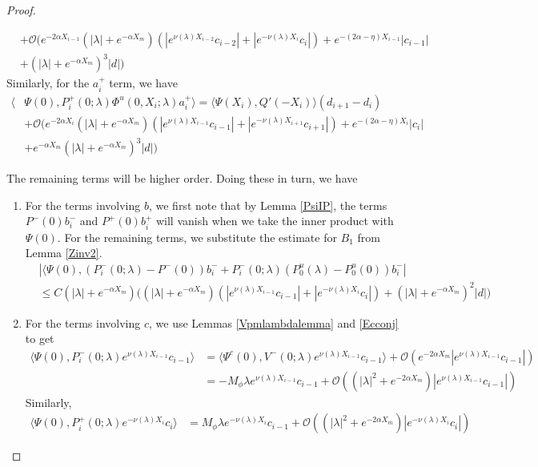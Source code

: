 \documentclass[thesis.tex]{subfiles}
\begin{document}
\begin{lemma}
\begin{proof}
\begin{enumerate}
\begin{align*}
&+ \mathcal{O}\Big(  
e^{-2 \alpha X_{i-1}} (|\lambda| + e^{-\alpha X_m})(|e^{\nu(\lambda)X_{i-2}} c_{i-2}| + |e^{-\nu(\lambda)X_i}c_i|) + e^{-(2 \alpha - \eta)X_{i-1}}|c_{i-1}| \\
&+ (|\lambda| + e^{-\alpha X_m})^3 |d| )
\end{align*}
Similarly, for the $a_i^+$ term, we have
\begin{align*}
\langle &\Psi(0), P_i^+(0; \lambda) \Phi^u(0, X_i; \lambda) a_i^+ \rangle = \langle \Psi(X_i), Q'(-X_i) \rangle (d_{i+1} - d_i ) \\
&+ \mathcal{O}\Big(  
e^{-2 \alpha X_i} (|\lambda| + e^{-\alpha X_m})(|e^{\nu(\lambda)X_{i-1}} c_{i-1}| + |e^{-\nu(\lambda)X_{i+1}}c_{i+1}|) + e^{-(2 \alpha - \eta)X_i}|c_i| \\
&+ e^{-\alpha X_m} 
(|\lambda| + e^{-\alpha X_m})^3 |d| )
\end{align*}
\end{enumerate}

The remaining terms will be higher order. Doing these in turn, we have
\begin{enumerate}
\item For the terms involving $b$, we first note that by Lemma \ref{PsiIP}, the terms $P^-(0) b_i^-$ and $P^+(0)b_i^+$ will vanish when we take the inner product with $\Psi(0)$. For the remaining terms, we substitute the estimate for $B_1$ from Lemma \ref{Zinv2}.
\begin{align*}
&|\langle \Psi(0), (P_i^-(0; \lambda) - P^-(0))b_i^- + P_i^-(0; \lambda)(P_0^u(\lambda) - P_0^u(0))b_i^-| \\
&\leq C (|\lambda| + e^{-\alpha X_m})\Big( 
(|\lambda| + e^{-\alpha X_m})( |e^{\nu(\lambda)X_{i-1}} c_{i-1}| + |e^{-\nu(\lambda)X_i} c_i|)+ (|\lambda| + e^{-\alpha X_m})^2|d| \Big)
\end{align*}

\item For the terms involving $c$, we use Lemmas \ref{Vpmlambdalemma} and \ref{Ecconj} to get
\begin{align*}
\langle \Psi(0), P_i^-(0; \lambda) e^{\nu(\lambda) X_{i-1}} c_{i-1} \rangle &= \langle \Psi^c(0), V^-(0; \lambda) e^{\nu(\lambda) X_{i-1}} c_{i-1} \rangle + \mathcal{O}(e^{-2 \alpha X_m}|e^{\nu(\lambda) X_{i-1}} c_{i-1}|) \\
&= -M_\phi \lambda e^{\nu(\lambda) X_{i-1}} c_{i-1} + \mathcal{O}((|\lambda|^2 + e^{-2 \alpha X_m})|e^{\nu(\lambda) X_{i-1}} c_{i-1}|)
\end{align*}
Similarly,
\begin{align*}
\langle \Psi(0), P_i^+(0; \lambda) e^{-\nu(\lambda) X_i} c_i \rangle 
&= M_\phi \lambda e^{-\nu(\lambda) X_i} c_{i-1} + \mathcal{O}((|\lambda|^2 + e^{-2 \alpha X_m})|e^{-\nu(\lambda) X_i} c_i|)
\end{align*}


\end{enumerate}
\end{proof}
\end{lemma}
\end{document}

